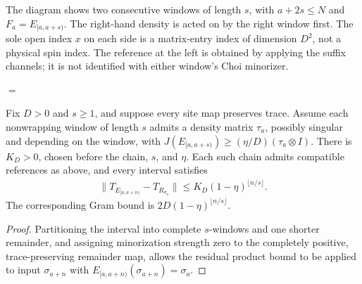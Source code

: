 The diagram shows two consecutive windows of length $s$, with $a+2s\le N$
and $F_a=E_{[a,a+s)}$. The right-hand
density is acted on by the right window first. The sole open index $x$
on each side is a matrix-entry index of dimension $D^2$, not a physical
spin index. The reference at the left is obtained by applying the suffix channels; it is
not identified with either window's Choi minorizer.
\begin{center}
    \tenkzkernel
    \begin{tenkzequation}
        \begin{tenkz}[rows={wire}, cols=5, bonds=none]
        \end{tenkz}
        $=$
        \begin{tenkz}[rows={wire}, cols=1, bonds=none]
        \end{tenkz}
    \end{tenkzequation}
\end{center}

\begin{lemma}
    \label{thm:ldp_window_mixing_rate}
    \leanok
    Fix $D>0$ and $s\ge1$, and suppose every site map preserves trace. Assume each
    nonwrapping window of length $s$ admits a density matrix
    $\tau_a$, possibly singular and depending on the window, with
    $J(E_{[a,a+s)})\ge(\eta/D)(\tau_a\otimes I)$.
    There is $K_D>0$, chosen before the chain, $s$, and $\eta$. Each
    such chain admits compatible references as above, and every interval satisfies
    \begin{align}
        \|T_{E_{[a,a+n)}}-T_{R_{\sigma_a}}\|
        \le K_D(1-\eta)^{\lfloor n/s\rfloor}.
    \end{align}
    The corresponding Gram bound is
    $2D(1-\eta)^{\lfloor n/s\rfloor}$.
\end{lemma}
\begin{proof}\leanok
    Partitioning the interval into complete $s$-windows and one shorter
    remainder, and assigning minorization strength zero to the completely
    positive, trace-preserving remainder map, allows the residual product
    bound to be applied to input $\sigma_{a+n}$ with
    $E_{[a,a+n)}(\sigma_{a+n})=\sigma_a$.
\end{proof}

